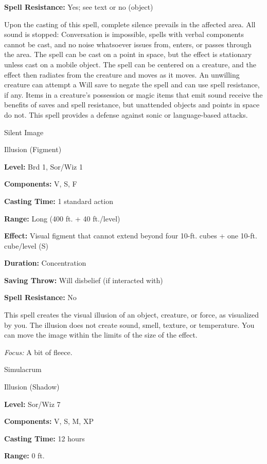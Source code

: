 \documentclass{article}
\begin{document}
\textbf{Spell Resistance:} Yes; see text or no (object)

Upon the casting of this spell, complete silence prevails in the affected area. 
All sound is stopped: Conversation is impossible, spells with verbal components 
cannot be cast, and no noise whatsoever issues from, enters, or passes through 
the area. The spell can be cast on a point in space, but the effect is stationary 
unless cast on a mobile object. The spell can be centered on a creature, and the 
effect then radiates from the creature and moves as it moves. An unwilling creature 
can attempt a Will save to negate the spell and can use spell resistance, if any. 
Items in a creature's possession or magic items that emit sound receive the benefits 
of saves and spell resistance, but unattended objects and points in space do not. 
This spell provides a defense against sonic or language-based attacks.

\vspace{12pt}
Silent Image

Illusion (Figment)

\textbf{Level:} Brd 1, Sor/Wiz 1

\textbf{Components:} V, S, F

\textbf{Casting Time:} 1 standard action

\textbf{Range:} Long (400 ft. + 40 ft./level)

\textbf{Effect:} Visual figment that cannot extend beyond four 10-ft. cubes + one 
10-ft. cube/level (S)

\textbf{Duration:} Concentration

\textbf{Saving Throw: }Will disbelief (if interacted with)

\textbf{Spell Resistance:} No

This spell creates the visual illusion of an object, creature, or force, as visualized 
by you. The illusion does not create sound, smell, texture, or temperature. You 
can move the image within the limits of the size of the effect.

\textit{Focus: }A bit of fleece.

\vspace{12pt}
Simulacrum

Illusion (Shadow)

\textbf{Level:} Sor/Wiz 7

\textbf{Components:} V, S, M, XP

\textbf{Casting Time:} 12 hours

\textbf{Range:} 0 ft.
\end{document}
